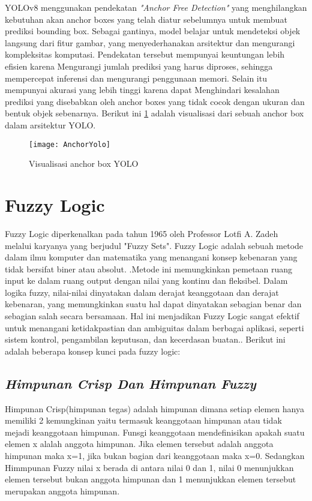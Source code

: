 YOLOv8 menggunakan pendekatan \textit{ "Anchor Free Detection"} yang menghilangkan kebutuhan akan anchor boxes yang telah diatur sebelumnya untuk membuat prediksi bounding box. Sebagai gantinya, model belajar untuk mendeteksi objek langsung dari fitur gambar, yang menyederhanakan arsitektur dan mengurangi kompleksitas komputasi. Pendekatan tersebut mempunyai keuntungan lebih efisien karena Mengurangi jumlah prediksi yang harus diproses, sehingga mempercepat inferensi dan mengurangi penggunaan memori. Selain itu mempunyai akurasi yang lebih tinggi karena dapat Menghindari kesalahan prediksi yang disebabkan oleh anchor boxes yang tidak cocok dengan ukuran dan bentuk objek sebenarnya. Berikut ini \cref{fig:anchor} adalah visualisasi dari sebuah anchor box dalam arsitektur YOLO.

\begin{figure}[H]
	\centering
	\texttt{[image: AnchorYolo]}
	\caption{Visualisasi anchor box YOLO}
	\label{fig:anchor}
\end{figure}

\section{Fuzzy Logic}
Fuzzy Logic diperkenalkan pada tahun 1965 oleh Professor Lotfi A. Zadeh melalui karyanya yang berjudul "Fuzzy Sets". Fuzzy Logic adalah sebuah metode dalam ilmu komputer dan matematika yang menangani konsep kebenaran yang tidak bersifat biner atau absolut.  \cite{kambalimath2020basic}.Metode ini memungkinkan pemetaan ruang input ke dalam ruang output dengan nilai yang kontinu dan fleksibel. Dalam logika fuzzy, nilai-nilai dinyatakan dalam derajat keanggotaan dan derajat kebenaran, yang memungkinkan suatu hal dapat dinyatakan sebagian benar dan sebagian salah secara bersamaan. Hal ini menjadikan Fuzzy Logic sangat efektif untuk menangani ketidakpastian dan ambiguitas dalam berbagai aplikasi, seperti sistem kontrol, pengambilan keputusan, dan kecerdasan buatan.\cite{sri2003artificial}. Berikut ini adalah beberapa konsep kunci pada fuzzy logic:
\subsection{\textit{Himpunan Crisp Dan Himpunan Fuzzy}}
Himpunan Crisp(himpunan tegas) adalah himpunan dimana setiap elemen hanya memiliki 2 kemungkinan yaitu termasuk keanggotaan himpunan atau tidak mejadi keanggotaan himpunan. Funsgi keanggotaan mendefinisikan apakah suatu elemen x alalah anggota himpunan. Jika elemen tersebut adalah anggota himpunan maka x=1, jika bukan bagian dari keanggotaan maka x=0. Sedangkan Himmpunan Fuzzy nilai x berada di antara nilai 0 dan 1, nilai 0 menunjukkan elemen tersebut bukan anggota himpunan dan 1 menunjukkan elemen tersebut merupakan anggota himpunan\cite{rindengan2019sistem}. 
